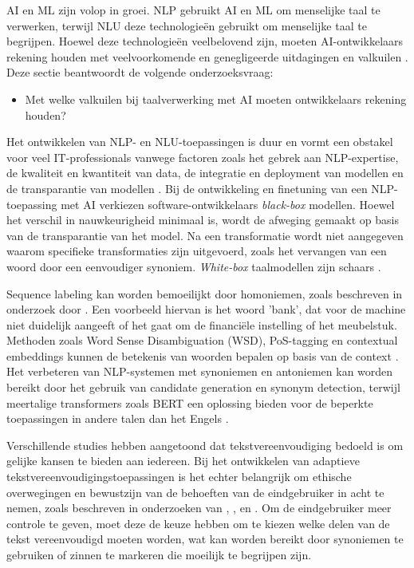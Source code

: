 AI en ML zijn volop in groei. NLP gebruikt AI en ML om menselijke taal te verwerken, terwijl NLU deze technologieën gebruikt om menselijke taal te begrijpen. Hoewel deze technologieën veelbelovend zijn, moeten AI-ontwikkelaars rekening houden met veelvoorkomende en genegligeerde uitdagingen en valkuilen \autocite{Sciforce2020, Roldos2020, Khurana2022}. Deze sectie beantwoordt de volgende onderzoeksvraag: 

\begin{itemize}
	\item Met welke valkuilen bij taalverwerking met AI moeten ontwikkelaars rekening houden?
\end{itemize}

\medspace

Het ontwikkelen van NLP- en NLU-toepassingen is duur en vormt een obstakel voor veel IT-professionals vanwege factoren zoals het gebrek aan NLP-expertise, de kwaliteit en kwantiteit van data, de integratie en deployment van modellen en de transparantie van modellen \autocite{IBM2022}. Bij de ontwikkeling en finetuning van een NLP-toepassing met AI verkiezen software-ontwikkelaars \textit{black-box} modellen. Hoewel het verschil in nauwkeurigheid minimaal is, wordt de afweging gemaakt op basis van de transparantie van het model. Na een transformatie wordt niet aangegeven waarom specifieke transformaties zijn uitgevoerd, zoals het vervangen van een woord door een eenvoudiger synoniem. \textit{White-box} taalmodellen zijn schaars \autocite{Punardeep2020}.

\medspace 

Sequence labeling kan worden bemoeilijkt door homoniemen, zoals beschreven in onderzoek door \textcite{Roldos2020}. Een voorbeeld hiervan is het woord 'bank', dat voor de machine niet duidelijk aangeeft of het gaat om de financiële instelling of het meubelstuk. Methoden zoals Word Sense Disambiguation (WSD), PoS-tagging en contextual embeddings kunnen de betekenis van woorden bepalen op basis van de context \autocite{Eisenstein2019, Liu2020}. Het verbeteren van NLP-systemen met synoniemen en antoniemen kan worden bereikt door het gebruik van candidate generation en synonym detection, terwijl meertalige transformers zoals BERT een oplossing bieden voor de beperkte toepassingen in andere talen dan het Engels \autocite{Dandekar2016, Roldos2020}.

\medspace

Verschillende studies hebben aangetoond dat tekstvereenvoudiging bedoeld is om gelijke kansen te bieden aan iedereen. Bij het ontwikkelen van adaptieve tekstvereenvoudigingstoepassingen is het echter belangrijk om ethische overwegingen en bewustzijn van de behoeften van de eindgebruiker in acht te nemen, zoals beschreven in onderzoeken van \textcite{Niemeijer2010}, \textcite{Xu2015}, en \textcite{Gooding2022}. Om de eindgebruiker meer controle te geven, moet deze de keuze hebben om te kiezen welke delen van de tekst vereenvoudigd moeten worden, wat kan worden bereikt door synoniemen te gebruiken of zinnen te markeren die moeilijk te begrijpen zijn.

